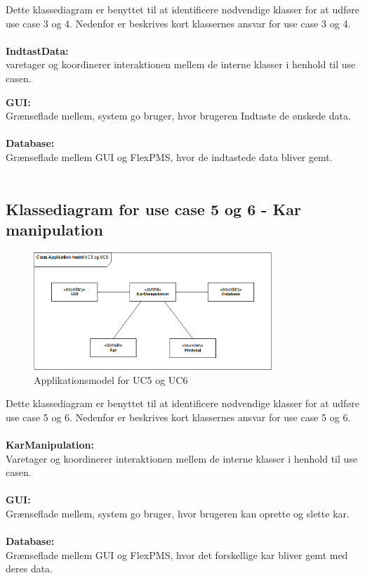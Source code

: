 Dette klassediagram er benyttet til at identificere nødvendige klasser for at udføre use case 3 og 4.
Nedenfor er beskrives kort klassernes ansvar for use case 3 og 4.
\\\\
\textbf{IndtastData:}\\
varetager og koordinerer interaktionen mellem de interne klasser i henhold til use casen.

\textbf{GUI:}\\
Grænseflade mellem, system go bruger, hvor brugeren Indtaste de ønskede data. 
\\\\

\textbf{Database:}\\
Grænseflade mellem GUI og FlexPMS, hvor de  indtastede data bliver gemt. 
\\\\

\subsection{Klassediagram for use case 5 og 6 - Kar manipulation}

\begin{figure}[H]
    \centering
    \includegraphics[width=0.8\textwidth]{Systemarkitektur/KlasseDiagrammer/5+6_KarManipulate.PNG}
    \caption{Applikationsmodel for UC5 og UC6}
    \label{fig:app_uc2}
\end{figure}

Dette klassediagram er benyttet til at identificere nødvendige klasser for at udføre use case 5 og 6.
Nedenfor er beskrives kort klassernes ansvar for use case 5 og 6.
\\\\
\textbf{KarManipulation:}\\
Varetager og koordinerer interaktionen mellem de interne klasser i henhold til use casen.
\\\\
\textbf{GUI:}\\
Grænseflade mellem, system go bruger, hvor brugeren kan oprette og slette kar. 
\\\\

\textbf{Database:}\\
Grænseflade mellem GUI og FlexPMS, hvor det forskellige kar bliver gemt med deres data. 
\\\\